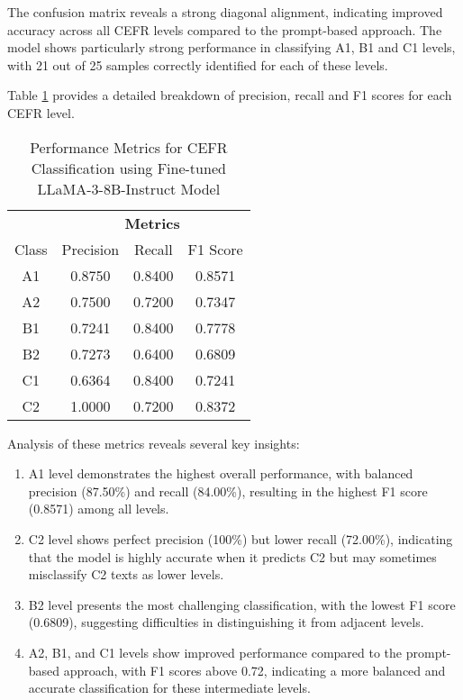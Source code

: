 The confusion matrix reveals a strong diagonal alignment, indicating improved accuracy across all CEFR levels compared to the prompt-based approach. The model shows particularly strong performance in classifying A1, B1 and C1 levels, with 21 out of 25 samples correctly identified for each of these levels.

Table \ref{tab:finetuned_performance_metrics} provides a detailed breakdown of precision, recall and F1 scores for each CEFR level.

\begin{table}[ht]
    \centering
    \begin{tabular}{c|ccc}
        & \multicolumn{3}{c}{\textbf{Metrics}} \\
        Class & Precision & Recall & F1 Score \\
        \hline
        A1 & 0.8750 & 0.8400 & 0.8571 \\
        A2 & 0.7500 & 0.7200 & 0.7347 \\
        B1 & 0.7241 & 0.8400 & 0.7778 \\
        B2 & 0.7273 & 0.6400 & 0.6809 \\
        C1 & 0.6364 & 0.8400 & 0.7241 \\
        C2 & 1.0000 & 0.7200 & 0.8372 \\
    \end{tabular}
    \caption{Performance Metrics for CEFR Classification using Fine-tuned LLaMA-3-8B-Instruct Model}
    \label{tab:finetuned_performance_metrics}
\end{table}

Analysis of these metrics reveals several key insights:

\begin{enumerate}
\item A1 level demonstrates the highest overall performance, with balanced precision (87.50\%) and recall (84.00\%), resulting in the highest F1 score (0.8571) among all levels.
\item C2 level shows perfect precision (100\%) but lower recall (72.00\%), indicating that the model is highly accurate when it predicts C2 but may sometimes misclassify C2 texts as lower levels.
\item B2 level presents the most challenging classification, with the lowest F1 score (0.6809), suggesting difficulties in distinguishing it from adjacent levels.
\item A2, B1, and C1 levels show improved performance compared to the prompt-based approach, with F1 scores above 0.72, indicating a more balanced and accurate classification for these intermediate levels.
\end{enumerate}

